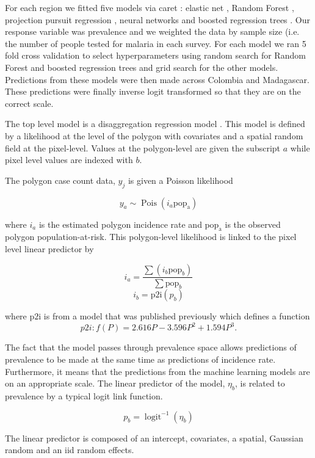 \documentclass[11pt]{article}
\begin{document}
For each region we fitted five models via caret \citep{caret}: elastic net \citep{enet}, Random Forest \citep{wright2015ranger}, projection pursuit regression \citep{friedman1981projection}, neural networks \citep{nnet} and boosted regression trees \citep{gbm}.
Our response variable was prevalence and we weighted the data by sample size (i.e. the number of people tested for malaria in each survey.
For each model we ran 5 fold cross validation to select hyperparameters using random search for Random Forest and boosted regression trees and grid search for the other models. 
Predictions from these models were then made across Colombia and Madagascar.
These predictions were finally inverse logit transformed so that they are on the correct scale.

The top level model is a disaggregation regression model \citep{sturrock2014fine, wilson2017pointless, law2018variational, taylor2017continuous, li2012log}.
This model is defined by a likelihood at the level of the polygon with covariates and a spatial random field at the pixel-level. 
Values at the polygon-level are given the subscript $a$ while pixel level values are indexed with $b$.

The polygon case count data, $y_j$ is given a Poisson likelihood

$$y_a \sim \operatorname{Pois}(i_a\mathrm{pop_a})$$

where $i_a$ is the estimated polygon incidence rate and $\mathrm{pop_a}$ is the observed polygon population-at-risk. 
This polygon-level likelihood is linked to the pixel level linear predictor by 

$$i_a = \frac{ \sum(i_b \mathrm{pop}_b)}{\sum  \mathrm{pop}_b} $$
$$i_b = \mathrm{p2i}(p_b)$$

where $\mathrm{p2i}$ is from a model that was published previously \citep{cameron2015defining} which defines a function
$${p2i}: f\left(P\right) = 2.616P - 3.596P^2 + 1.594P^3.$$

The fact that the model passes through prevalence space allows predictions of prevalence to be made at the same time as predictions of incidence rate.
Furthermore, it means that the predictions from the machine learning models are on an appropriate scale.
The linear predictor of the model, $\eta_b$, is related to prevalence by a typical logit link function.

$$p_b = \operatorname{logit}^{-1}(\eta_b)$$

The linear predictor is composed of an intercept, covariates, a spatial, Gaussian random and an iid random effects.
\end{document}

